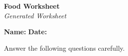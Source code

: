 \documentclass{article}
\begin{document}
\begin{center}
    \Huge \textbf{ Food Worksheet } \\[0.5cm]
    \large \textit{Generated Worksheet}
\end{center}

\vspace{1cm}

\noindent \textbf{Name:} \underline{\hspace{6cm}} \hfill \textbf{Date:} \underline{\hspace{4cm}}

\vspace{1cm}

Answer the following questions carefully.

\vspace{0.5cm}

\begin{enumerate}

\end{enumerate}
\end{document}
